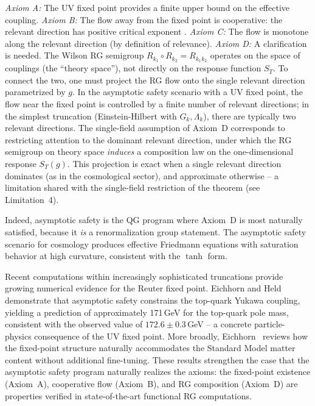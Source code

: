 \documentclass[aps,prd,twocolumn,superscriptaddress,nofootinbib]{revtex4-2}
\begin{document}
\textit{Axiom A:} The UV fixed point provides a finite upper bound on the effective coupling. \textit{Axiom B:} The flow away from the fixed point is cooperative: the relevant direction has positive critical exponent \cite{Percacci2017}. \textit{Axiom C:} The flow is monotone along the relevant direction (by definition of relevance). \textit{Axiom D:} A clarification is needed. The Wilson RG semigroup $R_{k_1} \circ R_{k_2} = R_{k_1 k_2}$ operates on the space of couplings (the ``theory space''), not directly on the response function $S_T$. To connect the two, one must project the RG flow onto the single relevant direction parametrized by $g$. In the asymptotic safety scenario with a UV fixed point, the flow near the fixed point is controlled by a finite number of relevant directions; in the simplest truncation (Einstein-Hilbert with $G_k, \Lambda_k$), there are typically two relevant directions. The single-field assumption of Axiom~D corresponds to restricting attention to the dominant relevant direction, under which the RG semigroup on theory space \textit{induces} a composition law on the one-dimensional response $S_T(g)$. This projection is exact when a single relevant direction dominates (as in the cosmological sector), and approximate otherwise -- a limitation shared with the single-field restriction of the theorem (see Limitation~4).

Indeed, asymptotic safety is the QG program where Axiom~D is most naturally satisfied, because it \textit{is} a renormalization group statement. The asymptotic safety scenario for cosmology \cite{Bonanno2002} produces effective Friedmann equations with saturation behavior at high curvature, consistent with the $\tanh$ form.

Recent computations within increasingly sophisticated truncations provide growing numerical evidence for the Reuter fixed point. Eichhorn and Held~\cite{EichhornHeld2018} demonstrate that asymptotic safety constrains the top-quark Yukawa coupling, yielding a prediction of approximately 171\,GeV for the top-quark pole mass, consistent with the observed value of $172.6 \pm 0.3$\,GeV \cite{PDG2024} -- a concrete particle-physics consequence of the UV fixed point. More broadly, Eichhorn~\cite{Eichhorn2020} reviews how the fixed-point structure naturally accommodates the Standard Model matter content without additional fine-tuning. These results strengthen the case that the asymptotic safety program naturally realizes the axioms: the fixed-point existence (Axiom~A), cooperative flow (Axiom~B), and RG composition (Axiom~D) are properties verified in state-of-the-art functional RG computations.
\end{document}
